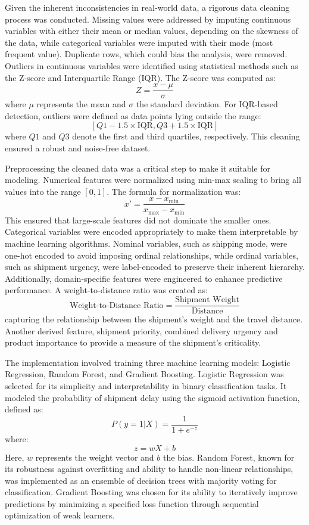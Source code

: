\documentclass[conference]{IEEEtran}
\begin{document}
Given the inherent inconsistencies in real-world data, a rigorous data cleaning process was conducted. Missing values were addressed by imputing continuous variables with either their mean or median values, depending on the skewness of the data, while categorical variables were imputed with their mode (most frequent value). Duplicate rows, which could bias the analysis, were removed. Outliers in continuous variables were identified using statistical methods such as the Z-score and Interquartile Range (IQR). The Z-score was computed as: 
\[
Z = \frac{x - \mu}{\sigma}
\]
where $\mu$ represents the mean and $\sigma$ the standard deviation. For IQR-based detection, outliers were defined as data points lying outside the range:
\[
[Q1 - 1.5 \times \text{IQR}, Q3 + 1.5 \times \text{IQR}]
\]
where $Q1$ and $Q3$ denote the first and third quartiles, respectively. This cleaning ensured a robust and noise-free dataset.

Preprocessing the cleaned data was a critical step to make it suitable for modeling. Numerical features were normalized using min-max scaling to bring all values into the range $[0,1]$. The formula for normalization was:
\[
x' = \frac{x - x_{\text{min}}}{x_{\text{max}} - x_{\text{min}}}
\]
This ensured that large-scale features did not dominate the smaller ones. Categorical variables were encoded appropriately to make them interpretable by machine learning algorithms. Nominal variables, such as shipping mode, were one-hot encoded to avoid imposing ordinal relationships, while ordinal variables, such as shipment urgency, were label-encoded to preserve their inherent hierarchy. Additionally, domain-specific features were engineered to enhance predictive performance. A weight-to-distance ratio was created as:
\[
\text{Weight-to-Distance Ratio} = \frac{\text{Shipment Weight}}{\text{Distance}}
\]
capturing the relationship between the shipment's weight and the travel distance. Another derived feature, shipment priority, combined delivery urgency and product importance to provide a measure of the shipment's criticality.

The implementation involved training three machine learning models: Logistic Regression, Random Forest, and Gradient Boosting. Logistic Regression was selected for its simplicity and interpretability in binary classification tasks. It modeled the probability of shipment delay using the sigmoid activation function, defined as:
\[
P(y=1|X) = \frac{1}{1 + e^{-z}}
\]
where:
\[
z = wX + b
\]
Here, $w$ represents the weight vector and $b$ the bias. Random Forest, known for its robustness against overfitting and ability to handle non-linear relationships, was implemented as an ensemble of decision trees with majority voting for classification. Gradient Boosting was chosen for its ability to iteratively improve predictions by minimizing a specified loss function through sequential optimization of weak learners.
\end{document}
